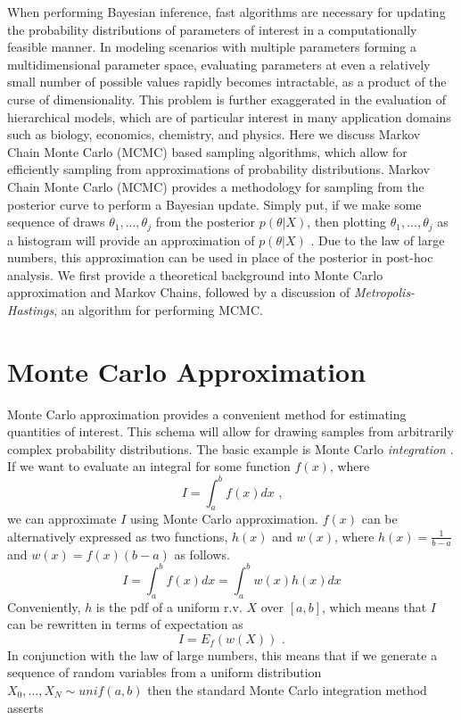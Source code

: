 \documentclass[
  12pt,
]{book}
\theoremstyle{definition}
\theoremstyle{definition}
\theoremstyle{definition}
\theoremstyle{remark}
\begin{document}
When performing Bayesian inference, fast algorithms are necessary for updating the probability distributions of parameters of interest in a computationally feasible manner.
In modeling scenarios with multiple parameters forming a multidimensional parameter space, evaluating parameters at even a relatively small number of possible values rapidly becomes intractable, as a product of the curse of dimensionality.
This problem is further exaggerated in the evaluation of hierarchical models, which are of particular interest in many application domains such as biology, economics, chemistry, and physics.
Here we discuss Markov Chain Monte Carlo (MCMC) based sampling algorithms, which allow for efficiently sampling from approximations of probability distributions.
Markov Chain Monte Carlo (MCMC) provides a methodology for sampling from the posterior curve to perform a Bayesian update.
Simply put, if we make some sequence of draws \(\theta_1,...,\theta_j\) from the posterior \(p(\theta|X)\), then plotting \(\theta_1,...,\theta_j\) as a histogram will provide an approximation of \(p(\theta|X)\) \citep[  11.4]{Wasserman2004}.
Due to the law of large numbers, this approximation can be used in place of the posterior in post-hoc analysis.
We first provide a theoretical background into Monte Carlo approximation and Markov Chains, followed by a discussion of \emph{Metropolis-Hastings}, an algorithm for performing MCMC.

\hypertarget{monte-carlo-approximation}{%
\section{Monte Carlo Approximation}\label{monte-carlo-approximation}}

Monte Carlo approximation provides a convenient method for estimating quantities of interest.
This schema will allow for drawing samples from arbitrarily complex probability distributions.
The basic example is Monte Carlo \emph{integration} \citep[  24.2]{Wasserman2004}.
If we want to evaluate an integral for some function \(f(x)\), where
\[I=\int_{a}^{b}f(x)dx \textrm{ ,}\]
we can approximate \(I\) using Monte Carlo approximation. \(f(x)\) can be alternatively expressed as two functions, \(h(x)\) and \(w(x)\), where \(h(x)=\frac{1}{b-a}\) and \(w(x)=f(x)(b-a)\) as follows.
\[I=\int_{a}^{b}f(x)dx=\int_{a}^{b}w(x)h(x)dx\]
Conveniently, \(h\) is the pdf of a uniform r.v. \(X\) over \([a,b]\), which means that \(I\) can be rewritten in terms of expectation as
\[I=E_{f}(w(X)) \textrm{ .}\]
In conjunction with the law of large numbers, this means that if we generate a sequence of random variables from a uniform distribution \(X_{0},...,X_{N}\sim unif(a,b)\) then the standard Monte Carlo integration method asserts
\end{document}
